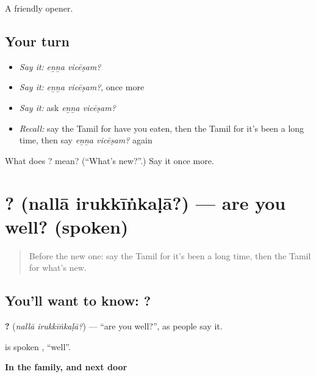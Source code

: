 \begin{grammarlens}[title={What you've built}]
A friendly opener.
\end{grammarlens}

\subsection*{Your turn}
\begin{itemize}
\raggedright
  \item \emph{Say it:} \emph{eṉṉa vicēṣam?}
  \item \emph{Say it:} \emph{eṉṉa vicēṣam?}, once more
  \item \emph{Say it:} ask \emph{eṉṉa vicēṣam?}
  \item \emph{Recall:} say the Tamil for have you eaten, then the Tamil for it's been a long time, then say \emph{eṉṉa vicēṣam?} again
\end{itemize}

\begin{tcolorbox}[breakable,colback=teal!4,colframe=teal!35!black,title={Before you move on}]
What does  ? mean? (\textquotedblleft{}What's new?\textquotedblright{}.) Say it once more.
\end{tcolorbox}
\section[\texorpdfstring{\ta{நல்லா} \ta{இருக்கீங்களா}? (nallā irukkīṅkaḷā?)}{நல்லா இருக்கீங்களா? (nallā irukkīṅkaḷā?)}]{ ? (nallā irukkīṅkaḷā?) — are you well? (spoken)}

\label{lesson:TA-C108-areyouwell}



\begin{quote}
Before the new one: say the Tamil for it's been a long time, then the Tamil for what's new.
\end{quote}

\subsection*{You'll want to know:  ?}
\textbf{ ?} (\emph{nallā irukkīṅkaḷā?}) — \textquotedblleft{}are you well?\textquotedblright{}, as people say it.

\textbf{} is spoken \textbf{}, \textquotedblleft{}well\textquotedblright{}.

\textbf{In the family, and next door}

